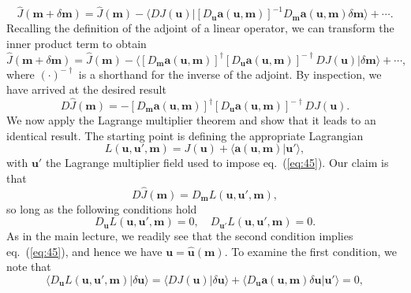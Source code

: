 \begin{equation}
\hat{J}(\mathbf{m}+\delta \mathbf{m})=\hat{J}(\mathbf{m})-\langle DJ(\mathbf{u})|
[D_{\mathbf{u}}\mathbf{a}(\mathbf{u},\mathbf{m})]^{-1}D_{\mathbf{m}}\mathbf{a}(\mathbf{u},\mathbf{m})\delta \mathbf{m}\rangle+\cdots.
\label{eq:52}
\end{equation}
Recalling the definition of the adjoint of a linear operator, we can transform the inner product term to obtain
\begin{equation}
\hat{J}(\mathbf{m}+\delta \mathbf{m})=\hat{J}(\mathbf{m})-\langle[D_{\mathbf{m}}
\mathbf{a}(\mathbf{u},\mathbf{m})]^{\dagger}[D_{\mathbf{u}}\mathbf{a}(\mathbf{u},\mathbf{m})]^{-\dagger}DJ
(\mathbf{u})|\delta \mathbf{m}\rangle+\cdots,
\label{eq:53}
\end{equation}
where $(\cdot)^{-\dagger}$ is a shorthand for the inverse of the adjoint. By inspection, we have arrived at the desired result
\begin{equation}
D\hat{J}(\mathbf{m})=-[D_{\mathbf{m}}\mathbf{a}(\mathbf{u},\mathbf{m})]^{\dagger}
[D_{\mathbf{u}}\mathbf{a}(\mathbf{u},\mathbf{m})]^{-\dagger}DJ(\mathbf{u}).
\label{eq:54}
\end{equation}
We now apply the Lagrange multiplier theorem and show that it leads to an identical result. The starting point is defining the appropriate Lagrangian
\begin{equation}
L(\mathbf{u},\mathbf{u}',\mathbf{m})=J(\mathbf{u})+\langle \mathbf{a}(\mathbf{u},\mathbf{m})|\mathbf{u}'\rangle,
\label{eq:55}
\end{equation}
with $\mathbf{u}'$ the Lagrange multiplier field used to impose eq.~(\ref{eq:45}). Our claim is that
\begin{equation}
D\hat{J}(\mathbf{m})=D_{\mathbf{m}}L(\mathbf{u},\mathbf{u}',\mathbf{m}),
\label{eq:56}
\end{equation}
so long as the following conditions hold
\begin{equation}
D_{\mathbf{u}}L(\mathbf{u},\mathbf{u}',\mathbf{m})=0, \quad D_{\mathbf{u}'}L(\mathbf{u},\mathbf{u}',\mathbf{m})=0.
\label{eq:57}
\end{equation}
As in the main lecture, we readily see that the second condition implies eq.~(\ref{eq:45}), and hence we have
 $\mathbf{u}=\hat{\mathbf{u}}(\mathbf{m})$. To examine the first condition, we note that
\begin{equation}
\langle D_{\mathbf{u}}L(\mathbf{u},\mathbf{u}',\mathbf{m})|\delta \mathbf{u}\rangle=\langle 
    DJ(\mathbf{u})|\delta \mathbf{u}\rangle+\langle D_{\mathbf{u}}\mathbf{a}(\mathbf{u},\mathbf{m})\delta \mathbf{u}|\mathbf{u}'\rangle=0,
\label{eq:58}
\end{equation}

